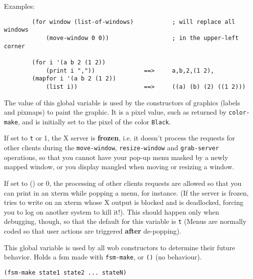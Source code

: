Examples:{\exemplefont\upspace\begin{verbatim}
        (for window (list-of-windows)           ; will replace all windows
            (move-window 0 0))                  ; in the upper-left corner

        (for i '(a b 2 (1 2)) 
            (print i ","))              ==>     a,b,2,(1 2),
        (mapfor i '(a b 2 (1 2))
            (list i))                   ==>     ((a) (b) (2) ((1 2)))
\end{verbatim}}

        

The value of this global variable is used by the constructors of graphics
(labels and pixmaps) to paint the graphic. It is a pixel value, such as
returned by \verb"color-make", and is initially set to the pixel of the color
\verb"Black".

        

If set to \verb"t" or 1, the X server is {\bf frozen}, i.e. it doesn't
process the requests for other clients during the \verb"move-window",
\verb"resize-window" and \verb"grab-server" operations, so that you cannot
have your pop-up menu masked by a newly mapped window, or you display
mangled when moving or resizing a window.

If set to () or 0, the processing of other clients requests are allowed so
that you can print in an xterm while popping a menu, for instance. (If the
server is frozen, {\GWM} tries to write on an xterm whose X output is blocked
and {\GWM} is deadlocked, forcing you to log on another system to kill it!).
This should happen only when debugging, though, so that the default for this
variable is \verb"t" (Menus are normally coded so that user actions are
triggered {\bf after} de-popping).

        

This global variable is used by all wob constructors to determine their future
behavior. Holds a fsm made with \verb"fsm-make", or \verb"()" (no behaviour).

        
{\usagefont\begin{verbatim}
(fsm-make state1 state2 ... stateN)
\end{verbatim}}\usageupspace

